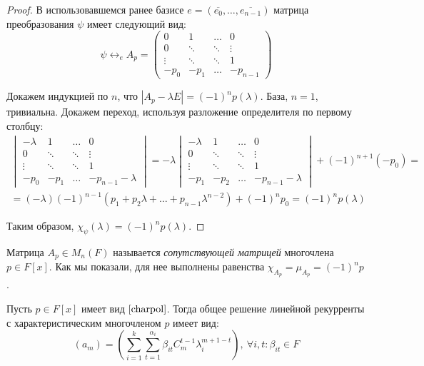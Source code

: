 \begin{proof}
	В использовавшемся ранее базисе $e = (\overline{e_0}, \dots, \overline{e_{n - 1}})$ матрица преобразования $\psi$ имеет следующий вид:
	\[\psi \leftrightarrow_e A_p = \begin{pmatrix}
		0 & 1 & \dots & 0 \\ 
		0 & \ddots & \ddots & \vdots \\ 
		\vdots & \ddots & \ddots & 1 \\ 
		-p_0 & -p_1 & \dots & -p_{n-1}
	\end{pmatrix}\]
	
	Докажем индукцией по $n$, что $|A_p - \lambda E| = (-1)^np(\lambda)$. База, $n = 1$, тривиальна. Докажем переход, используя разложение определителя по первому столбцу:
	\begin{multline*}\begin{vmatrix}
			-\lambda& 1 & \dots & 0 \\ 
			0 & \ddots & \ddots & \vdots \\ 
			\vdots & \ddots & \ddots & 1 \\ 
			-p_0 & -p_1 & \dots & -p_{n-1}-\lambda
		\end{vmatrix} = -\lambda\begin{vmatrix}
			-\lambda& 1 & \dots & 0 \\ 
			0 & \ddots & \ddots & \vdots \\ 
			\vdots & \ddots & \ddots & 1 \\ 
			-p_1 & -p_2 & \dots & -p_{n-1}-\lambda
		\end{vmatrix} + (-1)^{n+1}(-p_0) =\\
		= (-\lambda)(-1)^{n-1}(p_1 + p_2\lambda + \dots + p_{n - 1}\lambda^{n-2}) + (-1)^np_0 = (-1)^np(\lambda)
	\end{multline*}
	
	Таким образом, $\chi_\psi(\lambda) = (-1)^np(\lambda)$.
\end{proof}

\begin{note}
	Матрица $A_p \in M_n(F)$ называется \textit{сопутствующей матрицей} многочлена $p \in F[x]$. Как мы показали, для нее выполнены равенства $\chi_{A_p} = \mu_{A_p} = (-1)^np$.
\end{note}

\begin{theorem}
	Пусть $p \in F[x]$ имеет вид $\eqref*{charpol}$. Тогда общее решение линейной рекурренты с характеристическим многочленом $p$ имеет вид:
	\[(a_m) = \left(\sum_{i = 1}^k\sum_{t = 1}^{\alpha_i}\beta_{it}C_m^{t - 1}\lambda_i^{m + 1 - t}\right),~\forall i, t: \beta_{it} \in F\]
\end{theorem}

